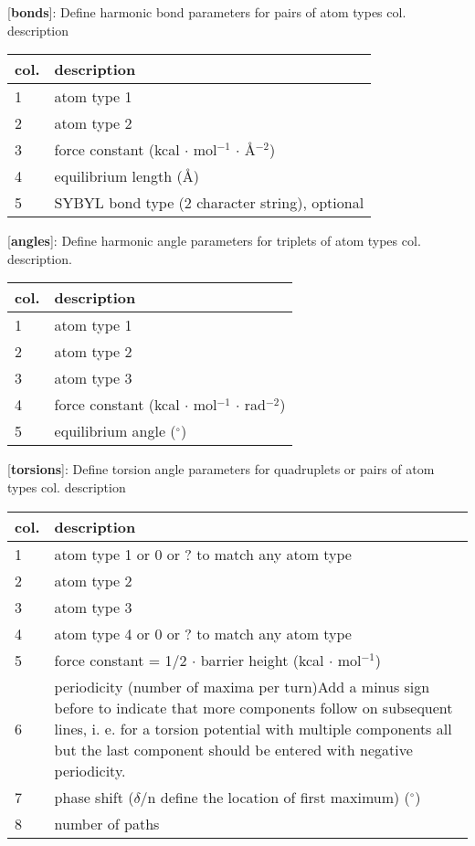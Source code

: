 \documentclass[a4paper,10pt]{article}
\begin{document}
[\textbf{bonds}]: Define harmonic bond parameters for pairs of
atom types col. description \\
\begin{tabularx}{\textwidth}{|l|X|}
\hline \bf{col.} & \bf{description} \\
\hline 1 &  atom type 1\\
\hline 2 &  atom type 2 \\
\hline 3 & force constant (kcal $\cdot$ mol$^{-1}$ $\cdot$ \AA$^{-2}$) \\
\hline 4 & equilibrium length (\AA) \\
\hline 5 & SYBYL bond type (2 character string), optional \\
\hline
\end{tabularx}

[\textbf{angles}]: Define harmonic angle parameters for triplets
of atom types col. description.\\
\begin{tabularx}{\textwidth}{|l|X|}
\hline \bf{col.} & \bf{description} \\
\hline 1 & atom type 1 \\
\hline 2  & atom type 2 \\
\hline 3 & atom type 3 \\
\hline 4 & force constant (kcal $\cdot$ mol$^{-1}$ $\cdot$ rad$^{-2}$) \\
\hline 5 & equilibrium angle ($^{\circ}$)\\
\hline
\end{tabularx}

[\textbf{torsions}]: Define torsion angle parameters for
quadruplets or pairs of atom types col. description \\
\begin{tabularx}{\textwidth}{|l|X|}
\hline \bf{col.} & \bf{description} \\
\hline 1  & atom type 1 or 0 or ? to match any atom type \\
\hline 2 & atom type 2 \\
\hline 3 & atom type 3 \\
\hline 4 & atom type 4 or 0 or ? to match any atom type \\
\hline 5  & force constant = 1/2 $\cdot$ barrier height (kcal $\cdot$ mol$^{-1}$) \\
\hline 6 & periodicity (number of maxima per turn)Add a minus sign
before to indicate that more components follow on subsequent
lines, i. e. for a torsion potential with multiple components all
but the last
component should be entered with negative periodicity. \\
\hline 7  & phase shift ($\delta$/n define the location of first maximum) ($^{\circ}$) \\
\hline 8 & number of paths \\
\hline
\end{tabularx}
\end{document}
